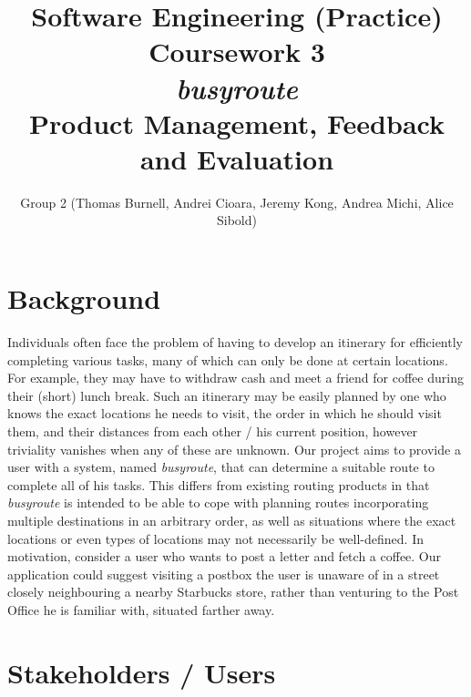 \documentclass[a4paper, 10pt]{article}
\begin{document}
\title{Software Engineering (Practice) Coursework 3 \\ \textit{busyroute} \\ Product Management, Feedback and Evaluation}
\author{Group 2 (Thomas Burnell, Andrei Cioara, Jeremy Kong, Andrea Michi, Alice Sibold)}
\maketitle

\section{Background}
Individuals often face the problem of having to develop an itinerary for efficiently completing various tasks, many of which can only be done at certain locations. For example, they may have to withdraw cash and meet a friend for coffee during their (short) lunch break. Such an itinerary may be easily planned by one who knows the exact locations he needs to visit, the order in which he should visit them, and their distances from each other / his current position, however triviality vanishes when any of these are unknown. Our project aims to provide a user with a system, named \textit{busyroute}, that can determine a suitable route to complete all of his tasks. This differs from existing routing products in that \textit{busyroute} is intended to be able to cope with planning routes incorporating multiple destinations in an arbitrary order, as well as situations where the exact locations or even types of locations may not necessarily be well-defined. In motivation, consider a user who wants to post a letter and fetch a coffee. Our application could suggest visiting a postbox the user is unaware of in a street closely neighbouring a nearby Starbucks store, rather than venturing to the Post Office he is familiar with, situated farther away.

\section{Stakeholders / Users}
\end{document}
